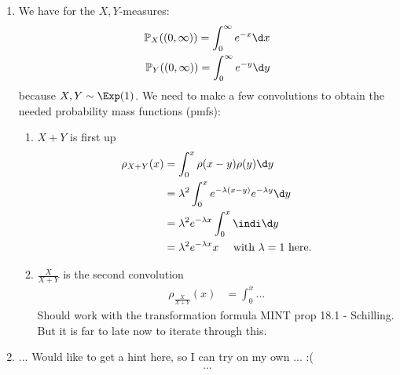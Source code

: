 \subsection{}
\begin{solution}
	\begin{enumerate}
		\item We have for the $X,Y$-measures:
		\begin{align*}
			\meas_X ((0,\infty)) = \int_{0}^{\infty} e^{-x} \d x\\
			\meas_Y ((0,\infty)) = \int_{0}^{\infty} e^{-y} \d y
		\end{align*}
		because $X,Y \sim \Exp(1)$.
		We need to make a few convolutions to obtain the needed probability mass functions (pmfs):
		\begin{enumerate}
			\item $X+Y$ is first up
			\begin{align*}
				\rho_{X+Y}(x) &= \int_{0}^x \rho(x-y)\rho(y) \d y\\
				&= \lambda^2 \int_{0}^x e^{-\lambda(x-y)} e^{-\lambda y}\d y\\
				&= \lambda^2 e^{-\lambda x} \int_{0}^x \indi \d y\\
				&= \lambda^2 e^{-\lambda x} x \quad\text{ with } \lambda = 1 \text{ here.}
			\end{align*}
			\item $\frac{X}{X+Y}$ is the second convolution
			\begin{align*}
				\rho_{\frac{X}{X+Y}} (x) &= \int_0^x ...
			\end{align*}
			Should work with the transformation formula MINT prop 18.1 - Schilling. But it is far to late now to iterate through this.
		\end{enumerate}
		\item ... Would like to get a hint here, so I can try on my own ... :(
		\begin{align*}
			...
		\end{align*}
	\end{enumerate}
\end{solution}
